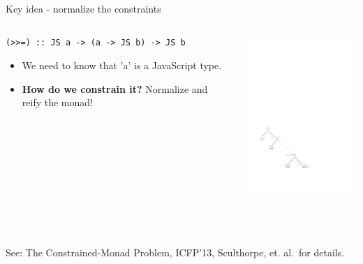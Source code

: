 \documentclass{beamer}
\begin{document}
\begin{frame}[fragile]{Key idea - normalize the constraints}

\begin{columns}
\begin{column}{0.45\textwidth}

\begin{codeblock}[0.8]
\tiny
\begin{verbatim}
(>>=) :: JS a -> (a -> JS b) -> JS b
\end{verbatim}
\end{codeblock}


\begin{itemize}
\item We need to know that 'a' is a JavaScript type.
\item {\bf How do we constrain it?} Normalize and reify the monad!
\end{itemize}

\end{column}

\begin{column}{0.55\textwidth}

\includegraphics[width=150pt]{MonadNormalForm.pdf}

\end{column}
\end{columns}

~\\
~\\
See: The Constrained-Monad Problem, ICFP'13, Sculthorpe, et. al.\ for details.


\end{frame}
\end{document}
